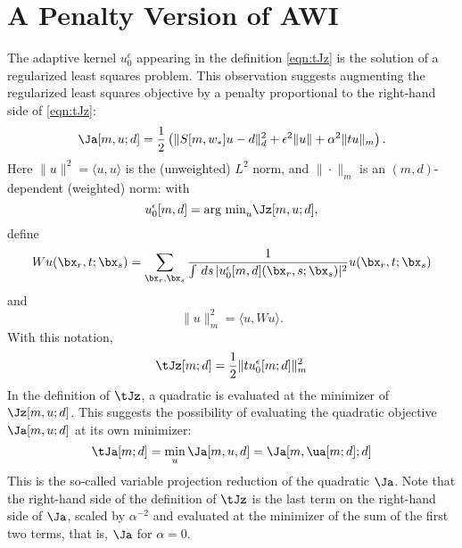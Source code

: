 \section{A Penalty Version of AWI}
The adaptive kernel $u_0^{\epsilon}$ appearing in the definition \ref{eqn:tJz} is the solution of a regularized least squares problem. This observation suggests augmenting the regularized least squares objective by a penalty proportional to the right-hand side of \ref{eqn:tJz}:
\begin{equation}
  \label{eqn:Ja}
  \Ja[m,u;d] = \frac{1}{2}\left(\|S[m,w_*]u-d\|_d^2 + \epsilon^2\|u\| + \alpha^2\|tu\|_m\right).
\end{equation}
Here $\|u\|^2 = \langle u, u \rangle$ is the (unweighted) $L^2$ norm, and $\|\cdot\|_m$ is an $(m,d)$-dependent (weighted) norm: with
\[
  u_0^{\epsilon}[m,d] = \mbox{arg min}_u \Jz[m,u;d],
\]
define
\[
  Wu (\bx_r,t;\bx_s) = \sum_{\bx_r,\bx_s}\frac{1}
  {\int\,ds\,|u_0^{\epsilon}[m,d](\bx_r,s;\bx_s)|^2}u(\bx_r,t;\bx_s)
\]
and
\begin{equation}
  \label{eqn:defmnorm}
  \|u\|^2_m = \langle u, W u \rangle.
\end{equation}
With this notation,
\[
  \tJz[m;d] = \frac{1}{2}\|tu^{\epsilon}_0[m;d]\|^2_m
\]
In the definition of $\tJz$, a quadratic is evaluated at the minimizer of $\Jz[m,u;d]$. This suggests the possibility of evaluating the quadratic objective $\Ja[m,u;d]$ at its own minimizer:
\begin{equation}
  \label{eqn:tJa}
  \tJa[m;d] = \min_u \Ja[m,u,d] = \Ja[m,\ua[m;d];d]
\end{equation}
This is the so-called variable projection reduction of the quadratic $\Ja$.
Note that the right-hand side of the definition of $\tJz$ is the last term on the right-hand side of $\Ja$, scaled by $\alpha^{-2}$ and evaluated at the minimizer of the sum of the first two terms, that is, $\Ja$ for $\alpha=0$.

